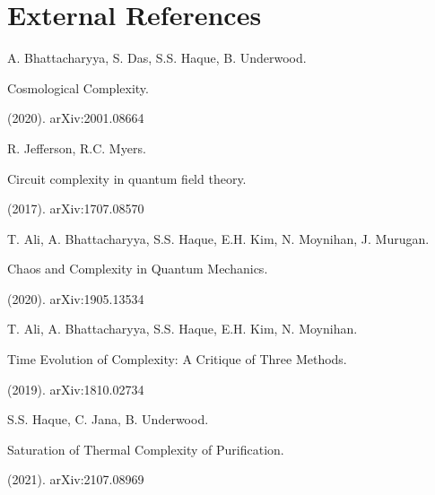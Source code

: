 \documentclass{article}
\begin{document}
\section*{External References}
\begin{enumerate}[label={[\arabic*]}]\item A. Bhattacharyya, S. Das, S.S. Haque, B. Underwood. \begin{textit}Cosmological Complexity. \end{textit}(2020). arXiv:2001.08664\item R. Jefferson, R.C. Myers. \begin{textit}Circuit complexity in quantum field theory. \end{textit}(2017). arXiv:1707.08570\item T. Ali, A. Bhattacharyya, S.S. Haque, E.H. Kim, N. Moynihan, J. Murugan. \begin{textit}Chaos and Complexity in Quantum Mechanics. \end{textit}(2020). arXiv:1905.13534\item T. Ali, A. Bhattacharyya, S.S. Haque, E.H. Kim, N. Moynihan. \begin{textit}Time Evolution of Complexity: A Critique of Three Methods. \end{textit}(2019). arXiv:1810.02734\item S.S. Haque, C. Jana, B. Underwood. \begin{textit}Saturation of Thermal Complexity of Purification. \end{textit}(2021). arXiv:2107.08969\end{enumerate}
\end{document}
